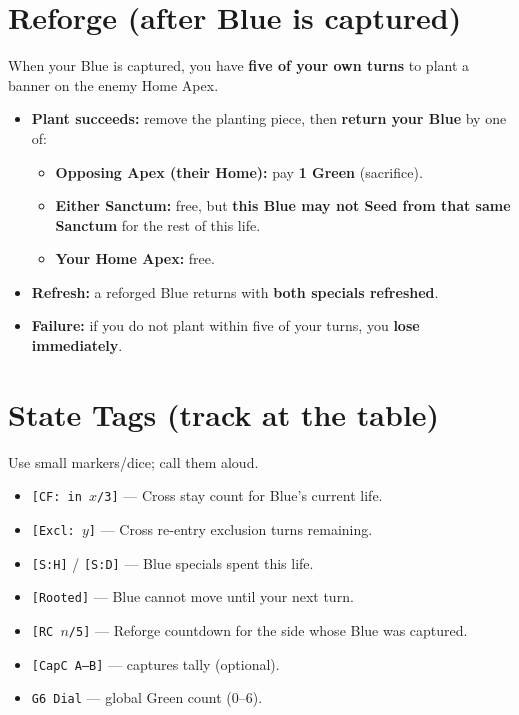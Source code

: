 \documentclass[11pt]{article}
\begin{document}
\section*{Reforge (after Blue is captured)}
When your Blue is captured, you have \textbf{five of your own turns} to plant a banner on the enemy Home Apex.
\begin{itemize}
  \item \textbf{Plant succeeds:} remove the planting piece, then \textbf{return your Blue} by one of:
    \begin{itemize}
      \item \textbf{Opposing Apex (their Home):} pay \textbf{1 Green} (sacrifice).
      \item \textbf{Either Sanctum:} free, but \textbf{this Blue may not Seed from that same Sanctum} for the rest of this life.
      \item \textbf{Your Home Apex:} free.
    \end{itemize}
  \item \textbf{Refresh:} a reforged Blue returns with \textbf{both specials refreshed}.
  \item \textbf{Failure:} if you do not plant within five of your turns, you \textbf{lose immediately}.
\end{itemize}

\section*{State Tags (track at the table)}
Use small markers/dice; call them aloud.
\begin{itemize}
  \item \texttt{[CF: in $x$/3]} --- Cross stay count for Blue's current life.
  \item \texttt{[Excl: $y$]} --- Cross re-entry exclusion turns remaining.
  \item \texttt{[S:H]} / \texttt{[S:D]} --- Blue specials spent this life.
  \item \texttt{[Rooted]} --- Blue cannot move until your next turn.
  \item \texttt{[RC $n$/5]} --- Reforge countdown for the side whose Blue was captured.
  \item \texttt{[CapC A--B]} --- captures tally (optional).
  \item \texttt{G6 Dial} --- global Green count (0--6).
\end{itemize}
\end{document}
